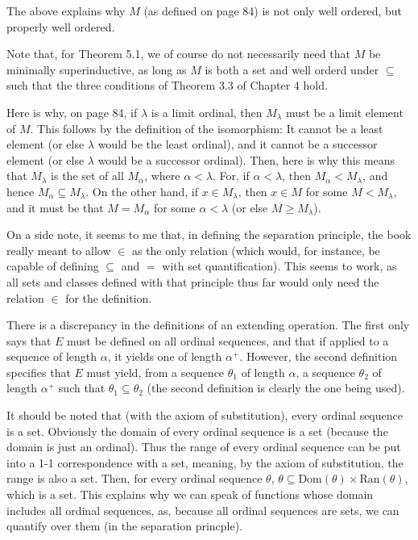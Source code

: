 \documentclass{article}
\theoremstyle{definition}
\begin{document}
The above explains why $M$ (as defined on page 84) is not only well ordered, but properly well ordered.

Note that, for Theorem 5.1, we of course do not necessarily need that $M$ be minimally superinductive, as long as $M$ is both a set and well orderd under 
$\subseteq$ such that the three conditions of Theorem 3.3 of Chapter 4 hold.

Here is why, on page 84, if $\lambda$ is a limit ordinal, then $M_\lambda$ must be a limit element of $M$. This follows by the definition of the isomorphism: 
It cannot be a least element (or else $\lambda$ would be the least ordinal), and it cannot be a successor element (or else $\lambda$ would be a successor ordinal). 
Then, here is why this means that $M_\lambda$ is the set of all $M_\alpha$, where $\alpha<\lambda$. For, if $\alpha<\lambda$, then 
$M_\alpha<M_\lambda$, and hence $M_\alpha\subseteq M_\lambda$. On the other hand, if $x\in M_\lambda$, then $x\in M$ for some $M<M_\lambda$, 
and it must be that $M=M_\alpha$ for some $\alpha<\lambda$ (or else $M\ge M_\lambda$).

On a side note, it seems to me that, in defining the separation principle, the book really meant to allow $\in$ as the only relation (which would, for instance, 
be capable of defining $\subseteq$ and $=$ with set quantification). This seems to work, as all sets and classes defined with that principle thus far would only need 
the relation $\in$ for the definition.

There is a discrepancy in the definitions of an extending operation. The first only says that $E$ must be defined on all ordinal sequences, and 
that if applied to a sequence of length $\alpha$, it yields one of length $\alpha^+$. However, the second definition specifies that 
$E$ must yield, from a sequence $\theta_1$ of length $\alpha$, a sequence $\theta_2$ of length $\alpha^+$ such that $\theta_1\subseteq\theta_2$ (the second 
definition is clearly the one being used).

It should be noted that (with the axiom of substitution), every ordinal sequence is a set. Obviously the domain of every ordinal sequence is a set
(because the domain is just an ordinal). Thus the range of every ordinal sequence can be put into a 1-1 correspondence with a set, meaning, by the 
axiom of substitution, the range is also a set. Then, for every ordinal sequence $\theta$, $\theta\subseteq\textrm{Dom}(\theta)\times\textrm{Ran}(\theta)$, which 
is a set. This explains why we can speak of functions whose domain includes all ordinal sequences, as, because all ordinal sequences are sets, we can 
quantify over them (in the separation princple).
\end{document}
